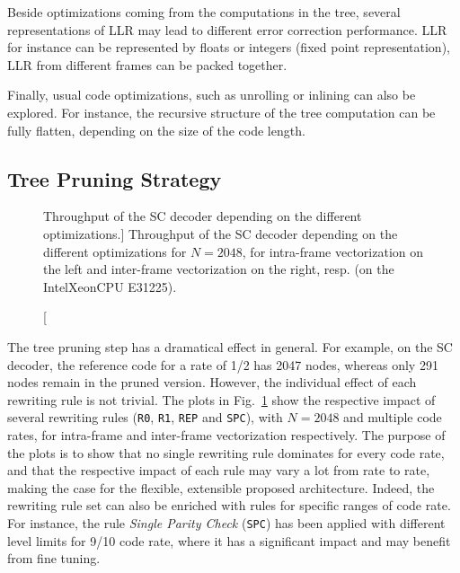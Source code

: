 Beside optimizations coming from the computations in the tree, several
representations of LLR may lead to different error correction performance. LLR
for instance can be represented by floats or integers (fixed point
representation), LLR from different frames can be packed together.

Finally, usual code optimizations, such as unrolling or inlining can also be
explored. For instance, the recursive structure of the tree computation can be
fully flatten, depending on the size of the code length.

\subsection{Tree Pruning Strategy}

\begin{figure}[htp]
  \centering
  \quad
  \caption
    [Throughput of the SC decoder depending on the different optimizations.]
    {Throughput of the SC decoder depending on the different optimizations for
    $N = 2048$, for intra-frame vectorization on the left and inter-frame
    vectorization on the right, resp. (on the Intel\R Xeon\TM CPU E31225).}
  \label{plot:polar_sc_tree_cut}
\end{figure}

The tree pruning step has a dramatical effect in general. For example, on the SC
decoder, the reference code for a rate of 1/2 has 2047 nodes, whereas only 291
nodes remain in the pruned version. However, the individual effect of each
rewriting rule is not trivial. The plots in Fig.~\ref{plot:polar_sc_tree_cut}
show the respective impact of several rewriting rules (\verb|R0|, \verb|R1|,
\verb|REP| and \verb|SPC|), with $N = 2048$ and multiple code rates, for
intra-frame and inter-frame vectorization respectively. The purpose of the plots
is to show that no single rewriting rule dominates for every code rate, and that
the respective impact of each rule may vary a lot from rate to rate, making the
case for the flexible, extensible proposed architecture. Indeed, the rewriting
rule set can also be enriched with rules for specific ranges of code rate. For
instance, the rule \emph{Single Parity Check} (\verb|SPC|) has been applied with
different level limits for 9/10 code rate, where it has a significant impact and
may benefit from fine tuning.

